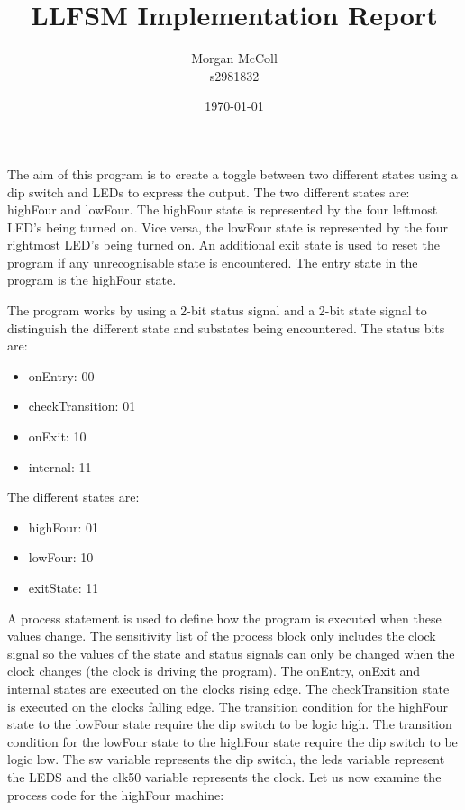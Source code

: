 \documentclass{article}
\begin{document}
	\title{LLFSM Implementation Report}
	\author{Morgan McColl \\s2981832}
	\date{\today}
	\maketitle
	
	The aim of this program is to create a toggle between two different states using a dip switch and LEDs to express the output. The two different states are: highFour and lowFour. The highFour state is represented by the four leftmost LED's being turned on. Vice versa, the lowFour state is represented by the four rightmost LED's being turned on. An additional exit state is used to reset the program if any unrecognisable state is encountered. The entry state in the program is the highFour state.
	
	The program works by using a 2-bit status signal and a 2-bit state signal to distinguish the different state and substates being encountered. The status bits are:
	\begin{itemize}
		\item onEntry: 00
		\item checkTransition: 01
		\item onExit: 10
		\item internal: 11
	\end{itemize}
	
	The different states are:
	\begin{itemize}
		\item highFour: 01
		\item lowFour: 10
		\item exitState: 11
	\end{itemize}
	
	A process statement is used to define how the program is executed when these values change. The sensitivity list of the process block only includes the clock signal so the values of the state and status signals can only be changed when the clock changes (the clock is driving the program). The onEntry, onExit and internal states are executed on the clocks rising edge. The checkTransition state is executed on the clocks falling edge. The transition condition for the highFour state to the lowFour state require the dip switch to be logic high. The transition condition for the lowFour state to the highFour state require the dip switch to be logic low. The sw variable represents the dip switch, the leds variable represent the LEDS and the clk50 variable represents the clock. Let us now examine the process code for the highFour machine:
	
\end{document}
